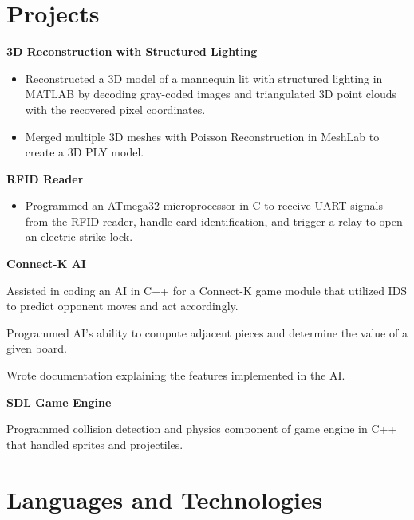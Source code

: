 \documentclass[10pt, letterpaper, sans]{moderncv} %
\begin{document}
\section{Projects}
\textbf{3D Reconstruction with Structured Lighting}
\begin{itemize}
\item Reconstructed a 3D model of a mannequin lit with structured lighting in MATLAB by decoding gray-coded images and triangulated 3D point clouds with the recovered pixel coordinates.
\item Merged multiple 3D meshes with Poisson Reconstruction in MeshLab to create a 3D PLY model.
\end{itemize}

\textbf{RFID Reader}
\begin{itemize}
\item Programmed an ATmega32 microprocessor in C to receive UART signals from the RFID reader, handle card identification, and trigger a relay to open an electric strike lock.
\end{itemize}

\textbf{Connect-K AI}
\begin{itemize}
{
\item Assisted in coding an AI in C++ for a Connect-K game module that utilized IDS to predict opponent moves and act accordingly.
\item Programmed AI's ability to compute adjacent pieces and determine the value of a given board.
\item Wrote documentation explaining the features implemented in the AI.
}
\end{itemize}

\textbf{SDL Game Engine}
\begin{itemize}
{
\item Programmed collision detection and physics component of game engine in C++ that handled sprites and projectiles.
}
\end{itemize}





\section{Languages and Technologies}

\end{document}
